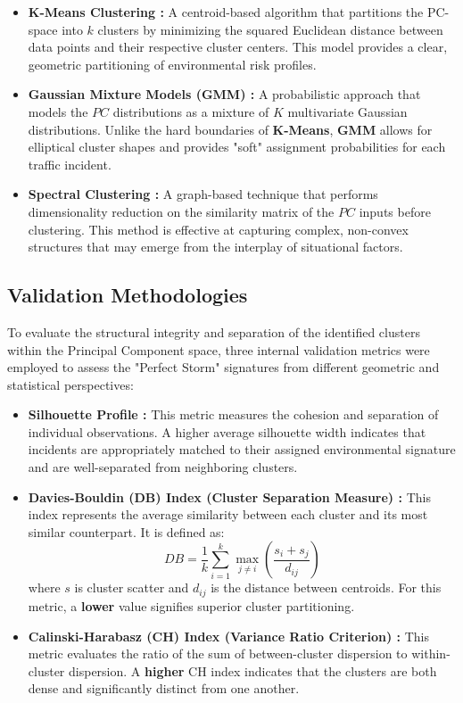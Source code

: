 \documentclass[conference]{IEEEtran}
\begin{document}
\begin{itemize}
	\item \textbf{K-Means Clustering \cite{MacQueen1967}:} A centroid-based algorithm that partitions the PC-space into $k$ clusters by minimizing the squared Euclidean distance between data points and their respective cluster centers. This model provides a clear, geometric partitioning of environmental risk profiles.
	
	\item \textbf{Gaussian Mixture Models (GMM) \cite{Dempster1977}:} A probabilistic approach that models the $PC$ distributions as a mixture of $K$ multivariate Gaussian distributions. Unlike the hard boundaries of \textbf{K-Means}, \textbf{GMM} allows for elliptical cluster shapes and provides "soft" assignment probabilities for each traffic incident.
	
	\item \textbf{Spectral Clustering \cite{Ng2001}:} A graph-based technique that performs dimensionality reduction on the similarity matrix of the $PC$ inputs before clustering. This method is effective at capturing complex, non-convex structures that may emerge from the interplay of situational factors.
\end{itemize}

\subsection{\textbf{Validation Methodologies}}
To evaluate the structural integrity and separation of the identified clusters within the Principal Component space, three internal validation metrics were employed to assess the "Perfect Storm" signatures from different geometric and statistical perspectives:

\begin{itemize}
	\item \textbf{Silhouette Profile \cite{Rousseeuw1987}:} This metric measures the cohesion and separation of individual observations. A higher average silhouette width indicates that incidents are appropriately matched to their assigned environmental signature and are well-separated from neighboring clusters.
	
	\item \textbf{Davies-Bouldin (DB) Index (Cluster Separation Measure) \cite{Davies1979}:} This index represents the average similarity between each cluster and its most similar counterpart. It is defined as:
	\[
	DB = \frac{1}{k} \sum_{i=1}^{k} \max_{j \neq i} \left( \frac{s_i + s_j}{d_{ij}} \right)
	\]
	where $s$ is cluster scatter and $d_{ij}$ is the distance between centroids. For this metric, a \textbf{lower} value signifies superior cluster partitioning.
	
	\item \textbf{Calinski-Harabasz (CH) Index (Variance Ratio Criterion) \cite{Calinski1974}:} This metric evaluates the ratio of the sum of between-cluster dispersion to within-cluster dispersion. A \textbf{higher} CH index indicates that the clusters are both dense and significantly distinct from one another.
\end{itemize}
\end{document}
